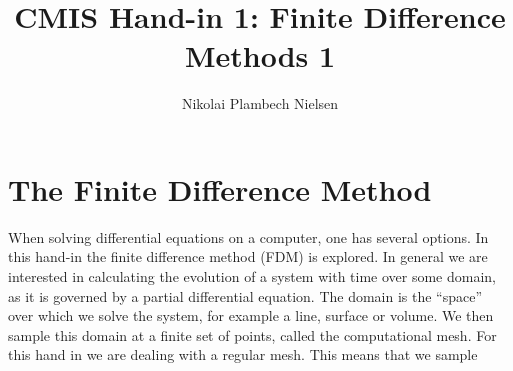 \documentclass[sigconf]{acmart}
\begin{document}
%
\title{CMIS Hand-in 1: Finite Difference Methods 1}

\author{Nikolai Plambech Nielsen}


\maketitle

\section{The Finite Difference Method}
When solving differential equations on a computer, one has several options. In this hand-in the finite difference method (FDM) is explored.
In general we are interested in calculating the evolution of a system with time over some domain, as it is governed by a partial differential equation. The domain is the ``space'' over which we solve the system, for example a line, surface or volume. We then sample this domain at a finite set of points, called the computational mesh. For this hand in we are dealing with a regular mesh. This means that we sample
\end{document}

